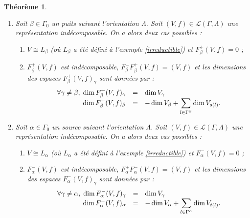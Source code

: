 \documentclass[a4paper,11pt]{article}
\newtheorem{thm}{Théorème}[section]
\newcommand{\dps}{\displaystyle}
\begin{document}
\begin{thm}
	\label{thm1}
	\begin{enumerate}
		Soit $(\Gamma,\Lambda)$ un carquois.
	\item Soit $\beta\in\Gamma_0 $ un puits suivant l'orientation $\Lambda$. Soit $(V,f)\in\mathscr L(\Gamma,\Lambda)$ une représentation indécomposable. On a alors deux cas possibles :
			\begin{enumerate}
				\item $V\cong L_\beta$ (où $L_\beta$ a été défini à l'exemple \ref{irreductible}) et $F_{\beta}^+(V,f)=0$ ;
				\item $F_\beta^+(V,f)$ est indécomposable, $F_\beta^-F_\beta^+(V,f)=(V,f)$ et les dimensions des espaces $F_\beta^+(V,f)_\gamma$ sont données par :
					\[
\begin{array}{>{\dps}r>{\dps}l>{\dps}l}
	\forall\gamma\neq\beta,\;\dim F_\beta^+(V,f)_\gamma&=& \dim V_\gamma\\
	\dim F_\beta^+(V,f)_\beta&=& -\dim V_\beta+\sum_{l\in\Gamma^{\beta}}\dim V_{s(l)}.
\end{array}
					\]
			\end{enumerate}
		\item Soit $\alpha\in\Gamma_0 $ un source suivant l'orientation $\Lambda$. Soit $(V,f)\in\mathscr L(\Gamma,\Lambda)$ une représentation indécomposable. On a alors deux cas possibles :
			\begin{enumerate}
				\item $V\cong L_\alpha$ (où $L_\alpha$ a été défini à l'exemple \ref{irreductible}) et $F_\alpha^-(V,f)=0$ ;
				\item $F_\alpha^-(V,f)$ est indécomposable, $F_\alpha^+F_\alpha^-(V,f)=(V,f)$ et les dimensions des espaces $F_\alpha^-(V,f)_\gamma$ sont données par :
					\[
\begin{array}{>{\dps}r>{\dps}l>{\dps}l}
	\forall\gamma\neq\alpha,\;\dim F_\alpha^-(V,f)_\gamma&=& \dim V_\gamma\\
	\dim F_\alpha^-(V,f)_\alpha&=& -\dim V_\alpha+\sum_{l\in\Gamma^{\alpha}}\dim V_{t(l)}.
\end{array}
					\]
			\end{enumerate}
	
	\end{enumerate}
\end{thm}
\end{document}

